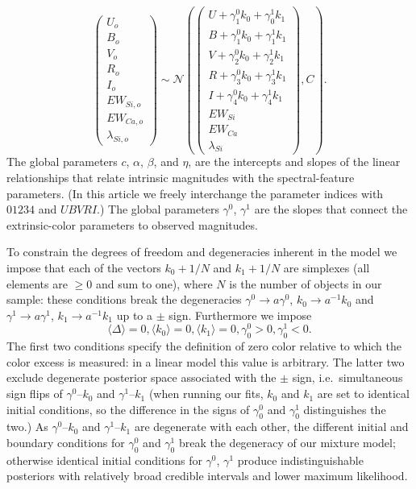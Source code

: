 \documentclass{aastex61}   	%
\begin{document}
\begin{equation}
\begin{pmatrix}
U_o\\B_o\\ V_o\\R_o\\I_o\\EW_{Si, o}\\ EW_{Ca, o} \\ \lambda_{Si, o}
\end{pmatrix}
\sim \mathcal{N}
\left(
\begin{pmatrix}
U +\gamma^0_{1} k_0 +\gamma^1_{0} k_1 \\B +\gamma^0_{1} k_0 +\gamma^1_{1} k_1 \\
V+\gamma^0_{2} k_0+\gamma^1_{2} k_1\\R+\gamma^0_{3} k_0 + \gamma^1_{3} k_1\\I+\gamma^0_{4} k_0+\gamma^1_{4} k_1\\
EW_{Si}\\ EW_{Ca} \\ \lambda_{Si}
\end{pmatrix}
,C
\right).
\label{dust:eqn}
\end{equation}
The global parameters $c$, $\alpha$, $\beta$,  and $\eta$,  are the intercepts and slopes of the linear relationships that
relate intrinsic magnitudes with the spectral-feature parameters.
(In this article we freely interchange the parameter indices with  $01234$ and $UBVRI$.)
The global parameters $\gamma^0$, $\gamma^1$  are the slopes that connect the extrinsic-color
parameters to observed magnitudes.

To constrain the degrees of freedom and degeneracies inherent in the model we impose that
each of the vectors $k_0+1/N$ and $k_1+1/N$ are simplexes (all elements are $\ge 0$ and sum to one),
where $N$ is the number of objects in our sample: these
conditions break the 
degeneracies  $\gamma ^0\rightarrow a\gamma^0$, $k_0 \rightarrow a^{-1}k_0$ and $\gamma^1 \rightarrow a\gamma^1$, $k_1 \rightarrow a^{-1}k_1$
up to a $\pm$ sign.
Furthermore we impose
\begin{equation}
\langle \Delta \rangle=0, \langle k_0 \rangle=0, \langle k_1 \rangle=0, \gamma^0_0 > 0, \gamma^1_0 < 0.
\end{equation}
The first two conditions specify the definition of zero color relative to which the color excess is measured:
in a linear model this value is arbitrary.
The latter two exclude degenerate posterior space
associated
with the $\pm$ sign, i.e.\ simultaneous sign flips of
$\gamma^0$--$k_0$ and $\gamma^1$--$k_1$
(when running our fits, $k_0$ and $k_1$ are set to
identical initial conditions, so the difference in the signs of $\gamma^0_0$ and $\gamma^1_0$ distinguishes the two.)
As  $\gamma^0$--$k_0$ and $\gamma^1$--$k_1$ are degenerate with
each other,
the different initial and boundary conditions for $\gamma^0_0$ and $\gamma^1_0$ break the degeneracy of our mixture model;
otherwise identical initial conditions for $\gamma^0$, $\gamma^1$ produce indistinguishable posteriors
with relatively broad credible intervals and lower maximum likelihood.
\end{document}
